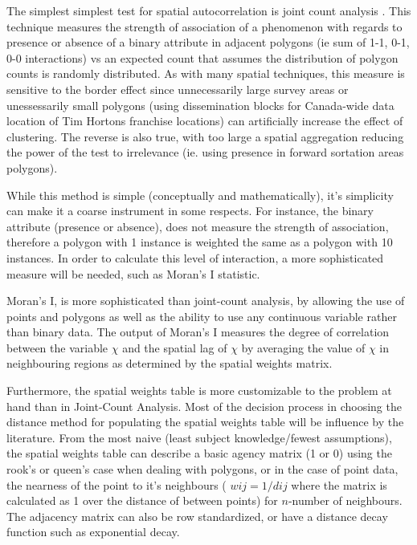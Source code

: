 \documentclass[12pt,letterpaper,notitlepage,onecolumn,final,openbib]{article}
\begin{document}
The simplest simplest test for spatial autocorrelation is joint count analysis \cite{LeeWong2001}. This technique measures the strength of association of a phenomenon with regards to presence or absence of a binary attribute in adjacent polygons (ie sum of 1-1, 0-1, 0-0 interactions) vs an expected count that assumes the distribution of polygon counts is randomly distributed. As with many spatial techniques, this measure is sensitive to the border effect since unnecessarily large survey areas or unessessarily small polygons (using dissemination blocks for Canada-wide data location of Tim Hortons franchise locations) can artificially increase the effect of clustering.  The reverse is also true, with too large a spatial aggregation reducing the power of the test to irrelevance (ie. using presence in forward sortation areas polygons).   

While this method is simple (conceptually and mathematically), it's simplicity can make it a coarse instrument in some respects.  For instance, the binary attribute (presence or absence), does not measure the strength of association, therefore a polygon with 1 instance is weighted the same as a polygon with 10 instances.  In order to calculate this level of interaction, a more sophisticated measure will be needed, such as Moran's I statistic.  

Moran's I, is more sophisticated than joint-count analysis, by allowing the use of points and  polygons as well as the ability to use any continuous variable rather than binary data.  The output of Moran's I measures the degree of correlation between the variable $\chi$ and the spatial lag of $\chi$ by averaging the value of $\chi$ in neighbouring regions as determined by the spatial weights matrix. 

Furthermore, the spatial weights table is more customizable to the problem at hand than in Joint-Count Analysis.  Most of the decision process in choosing the distance method for populating the spatial weights table will be influence by the literature.  From the most naive (least subject knowledge/fewest assumptions), the spatial weights table can describe a basic agency matrix (1 or 0) using the rook's or queen's case when dealing with polygons, or in the case of point data, the nearness of the point to it's neighbours ( $wij = 1/dij$ where the matrix is calculated as 1 over the distance of between points) for $n$-number of neighbours.  The adjacency matrix can also be row standardized, or have a distance decay function such as exponential decay.   



	\pagebreak
	
	
\end{document}
